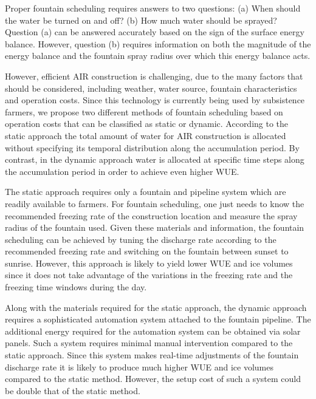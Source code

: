 \documentclass[utf8]{frontiersSCNS}
\begin{document}
Proper fountain scheduling requires answers to two questions: (a) When should the water be turned on and off?
(b) How much water should be sprayed? Question (a) can be answered accurately based on the sign of the surface
energy balance. However, question (b) requires information on both the magnitude of the energy balance and the
fountain spray radius over which this energy balance acts.  

However, efficient AIR construction is challenging, due to the many factors that should be considered, including
weather, water source, fountain characteristics and operation costs. Since this technology is currently being
used by subsistence farmers, we propose two different methods of fountain scheduling based on operation costs
that can be classified as static or dynamic. According to the static approach the total amount of water for AIR
construction is allocated without specifying its temporal distribution along the accumulation period. By
contrast, in the dynamic approach water is allocated at specific time steps along the accumulation period in
order to achieve even higher WUE.

The static approach requires only a fountain and pipeline system which are readily available to farmers. For
fountain scheduling, one just needs to know the recommended freezing rate of the construction location and
measure the spray radius of the fountain used. Given these materials and information, the fountain scheduling
can be achieved by tuning the discharge rate according to the recommended freezing rate and switching on the
fountain between sunset to sunrise. However, this approach is likely to yield lower WUE and ice volumes since it
does not take advantage of the variations in the freezing rate and the freezing time windows during the day.

Along with the materials required for the static approach, the dynamic approach requires a sophisticated
automation system attached to the fountain pipeline. The additional energy required for the automation system
can be obtained via solar panels. Such a system requires minimal manual intervention compared to the static
approach. Since this system makes real-time adjustments of the fountain discharge rate it is likely to produce
much higher WUE and ice volumes compared to the static method. However, the setup cost of such a system could be
double that of the static method.
\end{document}
